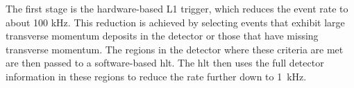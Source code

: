 The first stage is the hardware-based L1 trigger, which reduces the event rate to about 100 kHz. This reduction is achieved by selecting events that exhibit large transverse momentum deposits in the detector or those that have missing transverse momentum. The regions in the detector where these criteria are met are then passed to a software-based \ac{hlt}. The \ac{hlt} then uses the full detector information in these regions to reduce the rate further down to \qty[]{1}{kHz}.
